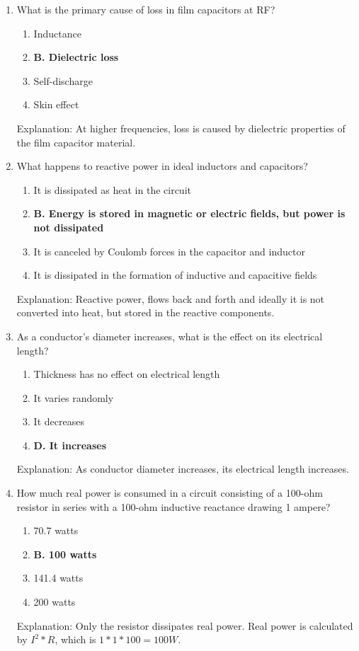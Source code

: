 \begin{enumerate}
      \item What is the primary cause of loss in film capacitors at RF?
      \begin{enumerate}
     \item  Inductance
       \item \textbf{B. Dielectric loss}
       \item  Self-discharge
       \item  Skin effect
        \end{enumerate}
       \textcolor{myred}{Explanation:}
        At higher frequencies, loss is caused by dielectric properties of the film capacitor material.
        
  \item What happens to reactive power in ideal inductors and capacitors?
    \begin{enumerate}
      \item  It is dissipated as heat in the circuit
         \item \textbf{B. Energy is stored in magnetic or electric fields, but power is not dissipated}
         \item  It is canceled by Coulomb forces in the capacitor and inductor
       \item  It is dissipated in the formation of inductive and capacitive fields
       \end{enumerate}
     \textcolor{myred}{Explanation:}
        Reactive power, flows back and forth and ideally it is not converted into heat, but stored in the reactive components.
   
   \item As a conductor's diameter increases, what is the effect on its electrical length?
      \begin{enumerate}
      \item  Thickness has no effect on electrical length
        \item  It varies randomly
        \item  It decreases
       \item \textbf{D. It increases}
        \end{enumerate}
         \textcolor{myred}{Explanation:}
    As conductor diameter increases, its electrical length increases.
    
    \item How much real power is consumed in a circuit consisting of a 100-ohm resistor in series with a 100-ohm inductive reactance drawing 1 ampere?
        \begin{enumerate}
         \item  70.7 watts
         \item \textbf{B. 100 watts}
         \item  141.4 watts
         \item  200 watts
        \end{enumerate}
         \textcolor{myred}{Explanation:}
     Only the resistor dissipates real power. Real power is calculated by $I^2*R$, which is $1*1*100 = 100W$.
        

\end{enumerate}
